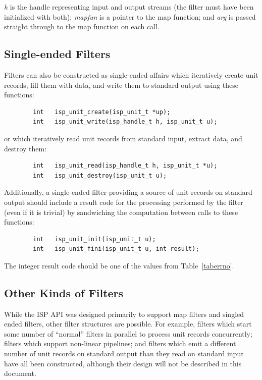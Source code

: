 \documentclass{article}
\begin{document}
{\em h} is the handle representing input and output streams (the filter
must have been initialized with both);
{\em mapfun} is a pointer to the map function; and
{\em arg} is passed straight through to the map function on each call.

\subsection{Single-ended Filters}

Filters can also be constructed as single-ended affairs which iteratively
create unit records, fill them with data, and write them to standard output
using these functions:
\begin{verbatim}
        int   isp_unit_create(isp_unit_t *up);
        int   isp_unit_write(isp_handle_t h, isp_unit_t u);
\end{verbatim}
or which iteratively read unit records from standard input, extract data,
and destroy them:
\begin{verbatim}
        int   isp_unit_read(isp_handle_t h, isp_unit_t *u);
        int   isp_unit_destroy(isp_unit_t u);
\end{verbatim}

Additionally, a single-ended filter providing a source of unit records
on standard output should include a result code for the processing performed
by the filter (even if it is trivial) by sandwiching the computation between
calls to these functions:
\begin{verbatim}
        int   isp_unit_init(isp_unit_t u);
        int   isp_unit_fini(isp_unit_t u, int result);
\end{verbatim}
The integer result code should be one of the values from Table~\ref{taberrno}.

\subsection{Other Kinds of Filters}

While the ISP API was designed primarily to support map filters and 
singled ended filters, other filter structures are possible.
For example, filters which start some number of ``normal'' filters in
parallel to process unit records concurrently;
filters which support non-linear pipelines; 
and filters which emit a different number of unit records on standard output
than they read on standard input have all been constructed, although
their design will not be described in this document.
\end{document}
